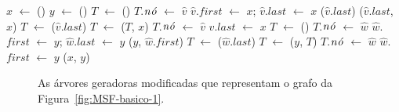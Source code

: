 \begin{algorithm}[htb]
\caption{\LCOLink($\hat v$, $\hat w$)}
\label{Algo:LCOLink}
\begin{algorithmic}[1]
\State $x$ $\gets$ \linkcutCreate()
\State $y$ $\gets$ \linkcutCreate()
  \State $T$ $\gets$ \treapCreate()
  \State $T$.$\mathit{n\acute{o}}$ $\gets$ $\hat v$
  \State $\hat v$.$first$ $\gets$ $x$; $\hat v$.$last$ $\gets$ $x$ 
\Else
  \State \linkcutEvert($\hat v$.$last$)
  \State \linkcutAddEdge($\hat v$.$last$, $x$)
  \State $T$ $\gets$ \treapGetRoot($\hat v$.$last$)
  \State $T$ $\gets$ \treapJoin($T$, $x$)
  \State $T$.$\mathit{n\acute{o}}$ $\gets$ $\hat v$
  \State $\hat v$.$last$ $\gets$ $x$
\EndIf
{}
  \State $T$ $\gets$ \treapCreate()
  \State $T$.$\mathit{n\acute{o}}$ $\gets$ $\hat w$
  \State $\hat w$.$first$ $\gets$ $y$; $\hat w$.$last$ $\gets$ $y$ 
\Else
  \State \linkcutAddEdge($y$, $\hat w$.$first$)
  \State $T$ $\gets$ \treapGetRoot($\hat w$.$last$)
  \State $T$ $\gets$ \treapJoin($y$, $T$)
  \State $T$.$\mathit{n\acute{o}}$ $\gets$ $\hat w$
  \State $\hat w$.$first$ $\gets$ $y$
\EndIf
\State \linkcutAddEdge($x$, $y$)
\end{algorithmic}
\end{algorithm}


\begin{figure}[htb]
\scalebox{1.5}{
\centering

}
\caption{As árvores geradoras modificadas que representam o grafo da Figura~\ref{fig:MSF-basico-1}.}
\label{fig:MSF-figura-4}
\end{figure}
